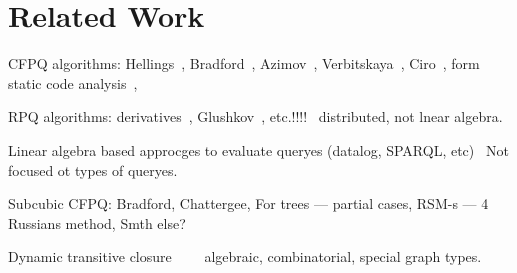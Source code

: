 \section{Related Work}

CFPQ algorithms: Hellings~\cite{!!!}, Bradford~\cite{!!!}, Azimov~\cite{!!!}, Verbitskaya~\cite{!!!}, Ciro~\cite{!!!}, form static code analysis~\cite{!!!}, 

RPQ algorithms: derivatives~\cite{!!!}, Glushkov~\cite{!!!}, etc.!!!!~\cite{!!!} distributed, not lnear algebra.

Linear algebra based approcges to evaluate queryes (datalog, SPARQL, etc)~\cite{!!!} Not focused ot types of queryes.

Subcubic CFPQ: Bradford, Chattergee, For trees --- partial cases, RSM-s --- 4 Russians method, Smth else? 

Dynamic transitive closure~\cite{!!!}~\cite{!!!}~\cite{!!!}~\cite{!!!} algebraic, combinatorial, special graph types.